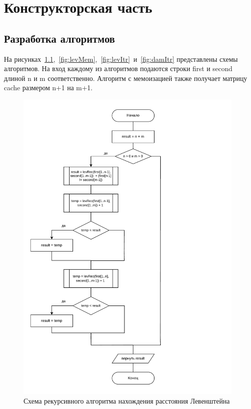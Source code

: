 \chapter{Конструкторская часть}

\section{Разработка алгоритмов}

На рисунках~\ref{fig:levRec},~\ref{fig:levMem},~\ref{fig:levItr}~и~\ref{fig:damItr} представлены схемы алгоритмов. На вход каждому из алгоритмов подаются строки first и second длиной n и m соответственно. Алгоритм с мемоизацией также получает матрицу cache размером n+1 на m+1.

\begin{figure}[h!]
	\centering
	\includegraphics[height=0.6\textheight]{tex_parts/scheme1.pdf}
	\caption{\label{fig:levRec}Схема рекурсивного алгоритма нахождения расстояния Левенштейна}
\end{figure}

